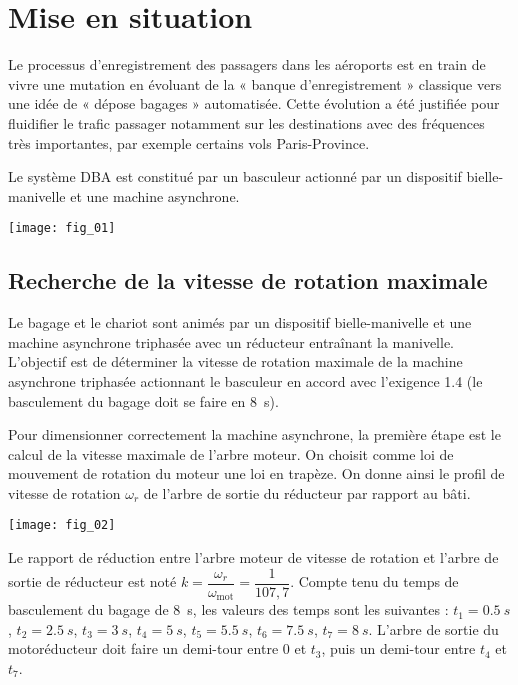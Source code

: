 \section*{Mise en situation}
\ifprof
\else
\fi

\ifprof
\else
Le processus d’enregistrement des passagers dans les aéroports est en train de
vivre une mutation en évoluant de la « banque d’enregistrement » classique vers une idée de « dépose bagages »
automatisée. Cette évolution a été justifiée pour fluidifier le trafic passager notamment sur les destinations avec
des fréquences très importantes, par exemple certains vols Paris-Province.


Le système DBA est constitué par un basculeur actionné par un dispositif bielle-manivelle et une machine
asynchrone.


\begin{center}
\texttt{[image: fig\_01]}
\end{center}

\fi

\subsection*{Recherche de la vitesse de rotation maximale}
\begin{obj} 
Le bagage et le chariot sont animés par un dispositif bielle-manivelle et une machine asynchrone
triphasée avec un réducteur entraînant la manivelle. L’objectif est de déterminer la vitesse de rotation
maximale de la machine asynchrone triphasée actionnant le basculeur en accord avec l’exigence 1.4
(le basculement du bagage doit se faire en \SI{8}{s}).
\end{obj}

\ifprof
\else
Pour dimensionner correctement la machine asynchrone, la première étape est le calcul de la vitesse maximale
de l’arbre moteur.
On choisit comme loi de mouvement de rotation du moteur une loi en trapèze. On donne ainsi le profil de vitesse de rotation $\omega_r$ de l’arbre de sortie du réducteur par rapport au bâti.

\begin{center}
\texttt{[image: fig\_02]}
\end{center}

Le rapport de réduction entre l’arbre moteur de vitesse de rotation et l’arbre de sortie de réducteur est noté $k=\dfrac{\omega_r}{\omega_{\text{mot}}} = \dfrac{1}{107,7}$.
Compte tenu du temps de basculement du bagage de \SI{8}{s}, les valeurs des temps sont les suivantes : $t_1=\SI{0,5}{s}$, $t_2=\SI{2,5}{s}$, $t_3=\SI{3}{s}$, $t_4=\SI{5}{s}$, $t_5=\SI{5,5}{s}$, $t_6=\SI{7,5}{s}$, $t_7=\SI{8}{s}$. L’arbre de sortie du motoréducteur doit faire un demi-tour entre 0 et $t_3$, puis un demi-tour entre $t_4$ et $t_7$.

